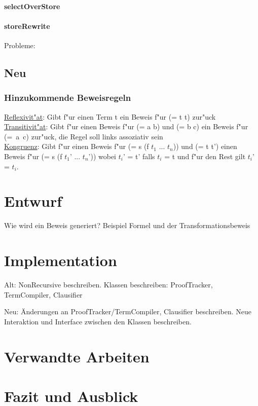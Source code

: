 \documentclass[a4paper]{article}
\begin{document}
\paragraph{selectOverStore}
\paragraph{storeRewrite}

Probleme:

\subsection{Neu}

\subsubsection{Hinzukommende Beweisregeln}
\uline{Reflexivit"at}: Gibt f"ur einen Term t ein Beweis f"ur (= t t) zur"uck\\
\uline{Transitivit"at}: Gibt f"ur einen Beweis f"ur (= a b) und (= b c) ein Beweis f"ur \mbox{(= a c)} zur"uck, die Regel soll links assoziativ sein\\
\uline{Kongruenz}: Gibt f"ur einen Beweis f"ur (= s (f $t_1$ ... $t_n$)) und (= t t') einen Beweis f"ur (= s (f $t_1$' ... $t_n$')) wobei $t_i$' = t' falls $t_i$ = t und f"ur den Rest gilt $t_i$' = $t_i$.\\



\section{Entwurf}

Wie wird ein Beweis generiert?
Beispiel Formel und der Transformationsbeweis

\section{Implementation}

Alt:
NonRecursive beschreiben.
Klassen beschreiben: ProofTracker, TermCompiler, Clausifier

Neu:
Änderungen an ProofTracker/TermCompiler, Clausifier beschreiben.
Neue Interaktion und Interface zwischen den Klassen beschreiben.


\section{Verwandte Arbeiten}

\section{Fazit und Ausblick}


\end{document}
